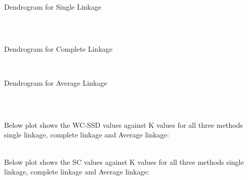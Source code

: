 \documentclass[11pt]{article}
\begin{document}
  \subsection{}
Dendrogram for Single Linkage


    \begin{center}
    \end{center}
    { \hspace*{\fill} \\}
    \subsection{}  
 
   Dendrogram for Complete Linkage

    \begin{center}
    \end{center}
    { \hspace*{\fill} \\}
    
Dendrogram for Average Linkage

    \begin{center}
    \end{center}
    { \hspace*{\fill} \\}
    
   \subsection{}
  Below plot shows the WC-SSD values against K values for all three methods single linkage, complete linkage and Average linkage:
    \begin{center}
    \end{center}
    { \hspace*{\fill} \\}
   Below plot shows the SC values against K values for all three methods single linkage, complete linkage and Average linkage: 
    \begin{center}
    \end{center}
    { \hspace*{\fill} \\}
\end{document}
